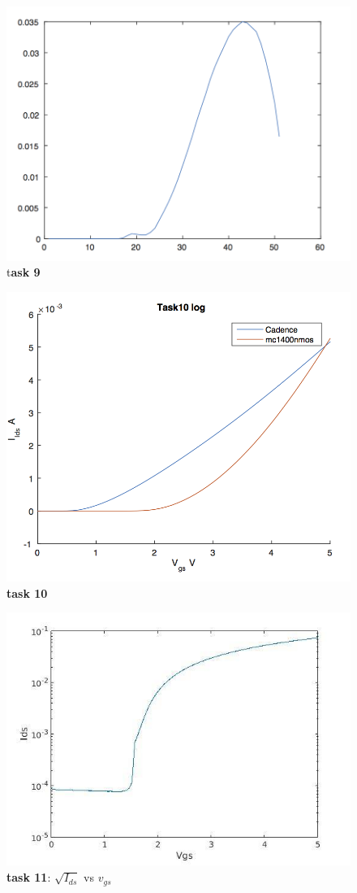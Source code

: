 \documentclass[11pt,a4paper,final]{report}
\begin{document}
\begin{figure}[ht!]
\caption{t\textbf{ask 9}}
\includegraphics[scale=1]{task9.png}
\end{figure}

\begin{figure}[ht!]
\caption{\textbf{task 10}}
\includegraphics[scale=1]{task10.png}
\end{figure}

\begin{figure}
\caption{\textbf{task 11}: $\sqrt{I_{ds}}$ vs $v_{gs}$}
\includegraphics[scale=1]{task11.jpg}
\end{figure}
\end{document}
